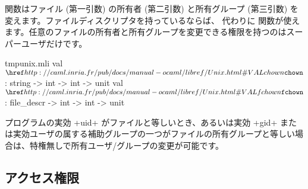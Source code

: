  関数はファイル (第一引数) の所有者 (第二引数) と所有グループ (第三引数) を変えます。ファイルディスクリプタを持っているならば、 代わりに  関数が使えます。任意のファイルの所有者と所有グループを変更できる権限を持つのはスーパーユーザだけです。
%
\begin{listingcodefile}{tmpunix.mli}
val $\libvalue{Unix}{chown}$ : string -> int -> int -> unit
val $\libvalue{Unix}{fchown}$ : file_descr -> int -> int -> unit
\end{listingcodefile}
プログラムの実効 \ml+uid+ がファイルと等しいとき、あるいは実効 \ml+gid+ または実効ユーザの属する補助グループの一つがファイルの所有グループと等しい場合は、特権無しで所有ユーザ/グループの変更が可能です。

\subsection*{アクセス権限}

